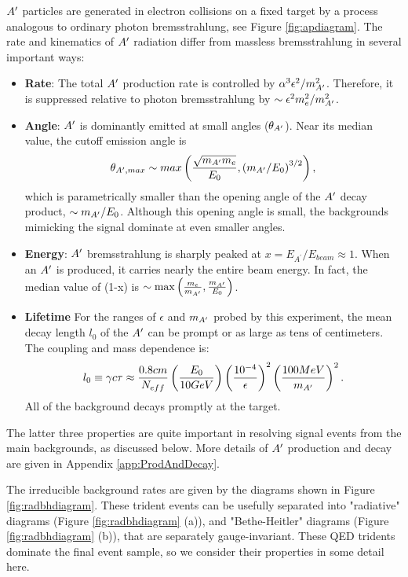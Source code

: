 $A^\prime$ particles are generated in electron collisions on a fixed target by a process analogous to ordinary photon bremsstrahlung, see Figure \ref{fig:apdiagram}.  The rate and kinematics of $A^\prime$ radiation differ from massless bremsstrahlung in several important ways:
\begin{itemize}
\item  {\bf Rate}: The total $A^\prime$ production rate is controlled by $\alpha^3\epsilon^2 / m_{A^\prime}^2$.  
 Therefore, it is suppressed relative to photon bremsstrahlung by $\sim \epsilon^2 m_e^2/m_{A^\prime}^2$. 
\item {\bf Angle}:  $A^\prime$  is dominantly  emitted at  small angles ($\theta_{A^\prime}$).  Near its median value, the cutoff emission angle is
\begin{equation}
\theta_{A^\prime,max}\sim max\left(\frac{\sqrt{m_{A^\prime} m_e}}{E_0},\left(m_{A^\prime}/E_0\right)^{3/2}\right),
\end{equation}
which is parametrically smaller than the opening angle of the $A^\prime$ decay product, $\sim  m_{A^\prime}/E_0$.  Although this opening angle is small, the backgrounds mimicking the signal dominate at even smaller angles.
\item {\bf Energy}:  $A^\prime$ bremsstrahlung is sharply peaked at $x=E_{A^\prime}/E_{beam}\approx 1$.  When an $A^\prime$ is produced, it carries nearly the entire beam energy.  In fact, the median value of (1-x) is $\sim {\rm max}\left(\frac{m_e}{m_{A^\prime}},\frac{m_{A^\prime}}{E_0}\right)$.  
\item{\bf Lifetime} For the ranges of $\epsilon$ and $m_{A^\prime}$ probed by this experiment, the mean decay length $l_0$ of the $A^\prime$ can be prompt or as large as tens of centimeters.   The coupling and mass dependence is:
\begin{equation}
l_0 \equiv \gamma c\tau \approx \frac{0.8 cm}{N_{eff}} \left(\frac{E_0}{10 GeV}\right)\left(\frac{10^{-4}}{\epsilon}\right)^2\left(\frac{100 MeV}{m_{A^\prime}}\right)^2.
\end{equation}
All of the background decays promptly at the target.  
\end{itemize}
The  latter three properties are quite important in resolving signal events from the main backgrounds, as discussed
below.   More details of $A^\prime$ production and decay are given in Appendix \ref{app:ProdAndDecay}.

The irreducible background rates are given by the diagrams shown in Figure \ref{fig:radbhdiagram}. These trident events can be usefully separated into "radiative" diagrams (Figure \ref{fig:radbhdiagram} (a)), and "Bethe-Heitler" diagrams (Figure \ref{fig:radbhdiagram} (b)), that are separately gauge-invariant.  These QED tridents dominate the final event sample, so we consider their properties in some detail here.

